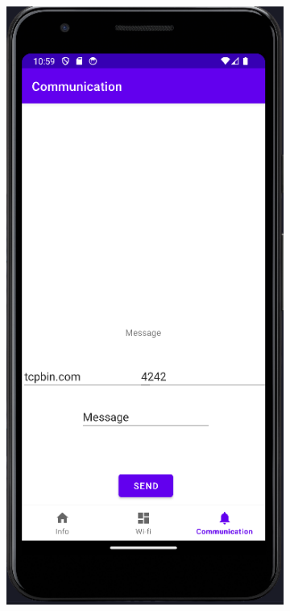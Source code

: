 \begin{figure}[H]
\begin{subfigure}{0.5\textwidth}
    \end{subfigure}
    \hfill
    \begin{subfigure}{0.5\textwidth}
        \includegraphics[width=\textwidth]{figs/comm_after.png}
    \end{subfigure}
\end{figure}